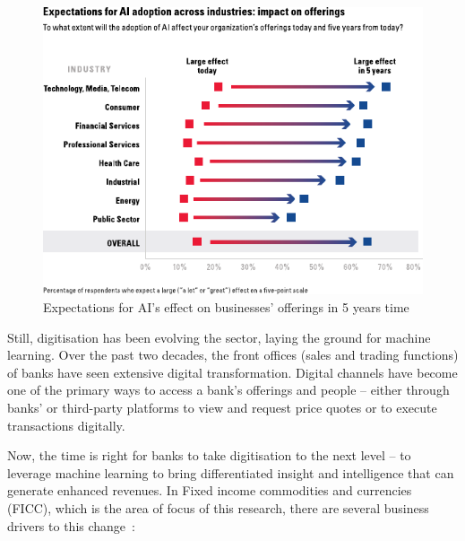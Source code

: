 \begin{figure}[!ht]\centering
\includegraphics[width=0.6\linewidth]{./figures/Ch1fig1.pdf}
\caption{Expectations for AI's effect on businesses' offerings in 5 years time~\autocite{ransbotham2017reshaping}}\label{Ch2Fig:1}
\end{figure}

Still, digitisation has been evolving the sector, laying the ground for machine learning. Over the past two decades, the front offices (sales and trading functions) of banks have seen extensive digital transformation. Digital channels have become one of the primary ways to access a bank’s offerings and people -- either through banks' or third-party platforms to view and request price quotes or to execute transactions digitally.


Now, the time is right for banks to take digitisation to the next level -- to leverage machine learning to bring differentiated insight and intelligence that can generate enhanced revenues. In Fixed income commodities and currencies (FICC), which is the area of focus of this research, there are several business drivers to this change~\autocite{MckinseyCompany}:

